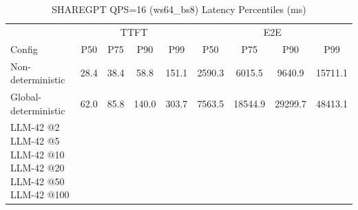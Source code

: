 \begin{table}[htbp]
\centering
\caption{SHAREGPT QPS=16 (ws64_bs8) Latency Percentiles (ms)}
\label{tab:sharegpt_qps16_ws64_bs8}
\begin{tabular}{l|cccc|cccc}
\toprule
& \multicolumn{4}{c|}{TTFT} & \multicolumn{4}{c}{E2E} \\
Config & P50 & P75 & P90 & P99 & P50 & P75 & P90 & P99 \\
\midrule
Non-deterministic & 28.4 & 38.4 & 58.8 & 151.1 & 2590.3 & 6015.5 & 9640.9 & 15711.1 \\
Global-deterministic & 62.0 & 85.8 & 140.0 & 303.7 & 7563.5 & 18544.9 & 29299.7 & 48413.1 \\
LLM-42 @2%
LLM-42 @5%
LLM-42 @10%
LLM-42 @20%
LLM-42 @50%
LLM-42 @100%
\bottomrule
\end{tabular}
\end{table}
